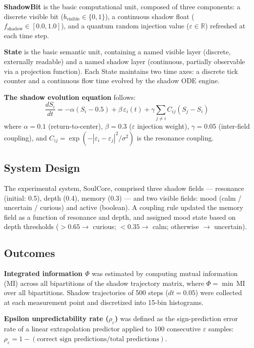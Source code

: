 \documentclass[11pt,a4paper]{article}
\begin{document}
\textbf{ShadowBit} is the basic computational unit, composed of three components:
a discrete visible bit ($b_{\mathrm{visible}} \in \{0,1\}$), a continuous shadow float
($f_{\mathrm{shadow}} \in [0.0, 1.0]$), and a quantum random injection value
($\varepsilon \in \mathbb{R}$) refreshed at each time step.

\textbf{State} is the basic semantic unit, containing a named visible layer (discrete,
externally readable) and a named shadow layer (continuous, partially observable via a
projection function). Each State maintains two time axes: a discrete tick counter and a
continuous flow time evolved by the shadow ODE engine.

\textbf{The shadow evolution equation} follows:
\begin{equation}
\frac{dS_i}{dt} = -\alpha(S_i - 0.5) + \beta\,\varepsilon_i(t)
                  + \gamma \sum_{j \neq i} C_{ij}(S_j - S_i)
\label{eq:ode}
\end{equation}
where $\alpha = 0.1$ (return-to-center), $\beta = 0.3$ ($\varepsilon$ injection weight),
$\gamma = 0.05$ (inter-field coupling), and
$C_{ij} = \exp(-|\varepsilon_i - \varepsilon_j|^2/\sigma^2)$ is the resonance coupling.

\subsection{System Design}

The experimental system, SoulCore, comprised three shadow fields --- resonance
(initial: 0.5), depth (0.4), memory (0.3) --- and two visible fields: mood
(calm / uncertain / curious) and active (boolean). A coupling rule updated the memory
field as a function of resonance and depth, and assigned mood state based on depth
thresholds ($> 0.65 \to$ curious; $< 0.35 \to$ calm; otherwise $\to$ uncertain).

\subsection{Outcomes}

\textbf{Integrated information $\Phi$} was estimated by computing mutual information
(MI) across all bipartitions of the shadow trajectory matrix, where
$\Phi = \min\,\mathrm{MI}$ over all bipartitions. Shadow trajectories of 500 steps
($dt = 0.05$) were collected at each measurement point and discretized into 15-bin
histograms.

\textbf{Epsilon unpredictability rate ($\rho_\varepsilon$)} was defined as the
sign-prediction error rate of a linear extrapolation predictor applied to 100
consecutive $\varepsilon$ samples:
$\rho_\varepsilon = 1 - (\text{correct sign predictions} / \text{total predictions})$.
\end{document}

